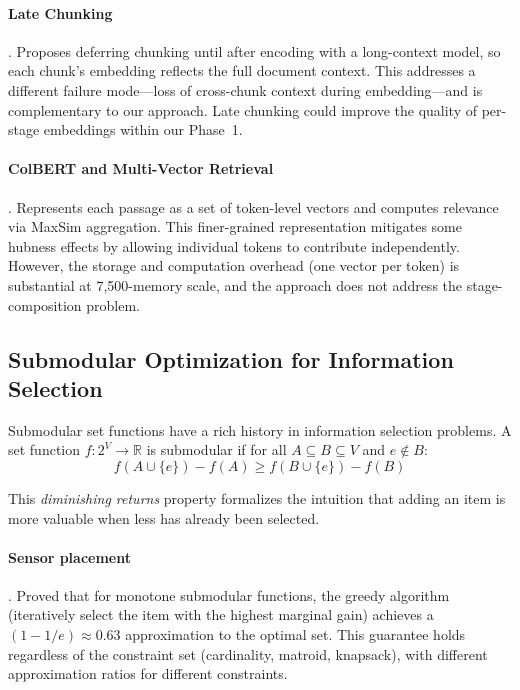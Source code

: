\documentclass[11pt]{article}
\begin{document}
\paragraph{Late Chunking} \citep{JinaAI2025}.
Proposes deferring chunking until after encoding with a long-context
model, so each chunk's embedding reflects the full document context.
This addresses a different failure mode---loss of cross-chunk context
during embedding---and is complementary to our approach.  Late
chunking could improve the quality of per-stage embeddings within our
Phase~1.

\paragraph{ColBERT and Multi-Vector Retrieval} \citep{Khattab2020}.
Represents each passage as a set of token-level vectors and computes
relevance via MaxSim aggregation.  This finer-grained representation
mitigates some hubness effects by allowing individual tokens to
contribute independently.  However, the storage and computation
overhead (one vector per token) is substantial at 7,500-memory scale,
and the approach does not address the stage-composition problem.

\subsection{Submodular Optimization for Information Selection}
\label{sec:submodular-background}

Submodular set functions have a rich history in information selection
problems.  A set function $f: 2^V \to \mathbb{R}$ is submodular if
for all $A \subseteq B \subseteq V$ and $e \notin B$:
\begin{equation}
f(A \cup \{e\}) - f(A) \geq f(B \cup \{e\}) - f(B)
\label{eq:submodular}
\end{equation}

This \emph{diminishing returns} property formalizes the intuition that
adding an item is more valuable when less has already been selected.

\paragraph{Sensor placement} \citep{Krause2008}.
Proved that for monotone submodular functions, the greedy algorithm
(iteratively select the item with the highest marginal gain) achieves
a $(1 - 1/e) \approx 0.63$ approximation to the optimal set.  This
guarantee holds regardless of the constraint set (cardinality,
matroid, knapsack), with different approximation ratios for different
constraints.
\end{document}

